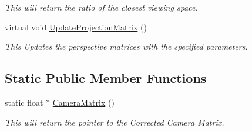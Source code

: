 \begin{DoxyCompactItemize}
\begin{DoxyCompactList}\small\item\em This will return the ratio of the closest viewing space. \end{DoxyCompactList}\item 
\hypertarget{classc_perspective_control_a21f71c817289e0f250dbe9fa83f269bd}{
virtual void \hyperlink{classc_perspective_control_a21f71c817289e0f250dbe9fa83f269bd}{UpdateProjectionMatrix} ()}
\label{classc_perspective_control_a21f71c817289e0f250dbe9fa83f269bd}

\begin{DoxyCompactList}\small\item\em This Updates the perspective matrices with the specified parameters. \end{DoxyCompactList}\end{DoxyCompactItemize}
\subsection*{Static Public Member Functions}
\begin{DoxyCompactItemize}
\item 
\hypertarget{classc_perspective_control_a1a7781d158a255d67d95924345f2230e}{
static float $\ast$ \hyperlink{classc_perspective_control_a1a7781d158a255d67d95924345f2230e}{CameraMatrix} ()}
\label{classc_perspective_control_a1a7781d158a255d67d95924345f2230e}

\begin{DoxyCompactList}\small\item\em This will return the pointer to the Corrected Camera Matrix. \end{DoxyCompactList}\end{DoxyCompactItemize}
